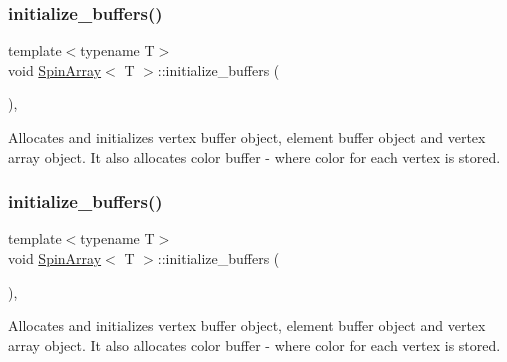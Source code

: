 \subsubsection{\texorpdfstring{initialize\+\_\+buffers()}{initialize\_buffers()}\hspace{0.1cm}{\footnotesize\ttfamily [2/4]}}
{\footnotesize\ttfamily template$<$typename T$>$ \\
void \mbox{\hyperlink{classSpinArray}{Spin\+Array}}$<$ T $>$\+::initialize\+\_\+buffers (\begin{DoxyParamCaption}{ }\end{DoxyParamCaption})\hspace{0.3cm}{\ttfamily [inline]}, {\ttfamily [private]}}



Allocates and initializes vertex buffer object, element buffer object and vertex array object. It also allocates color buffer -\/ where color for each vertex is stored. 

\mbox{\label{classSpinArray_a3a7064b0c74a8a777d8a987f29c31108}} 
\subsubsection{\texorpdfstring{initialize\+\_\+buffers()}{initialize\_buffers()}\hspace{0.1cm}{\footnotesize\ttfamily [3/4]}}
{\footnotesize\ttfamily template$<$typename T$>$ \\
void \mbox{\hyperlink{classSpinArray}{Spin\+Array}}$<$ T $>$\+::initialize\+\_\+buffers (\begin{DoxyParamCaption}{ }\end{DoxyParamCaption})\hspace{0.3cm}{\ttfamily [inline]}, {\ttfamily [private]}}



Allocates and initializes vertex buffer object, element buffer object and vertex array object. It also allocates color buffer -\/ where color for each vertex is stored. 

\mbox{\label{classSpinArray_a3a7064b0c74a8a777d8a987f29c31108}} 

